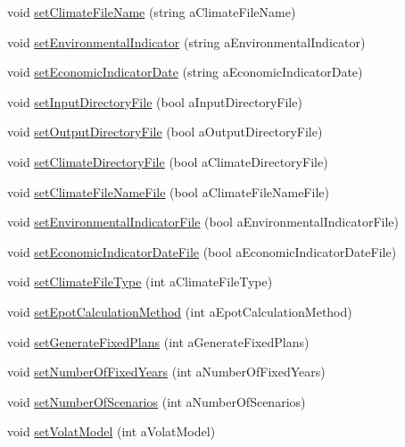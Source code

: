 \begin{DoxyCompactItemize}
\item 
void \hyperlink{classsystem_run_data_af47cd03f00b0ae29a8f5b83eee8ba440}{setClimateFileName} (string aClimateFileName)
\item 
void \hyperlink{classsystem_run_data_a3d9492ef34cf74ea73edf84ff810778e}{setEnvironmentalIndicator} (string aEnvironmentalIndicator)
\item 
void \hyperlink{classsystem_run_data_a6f7742228596337028e277054adf9c7b}{setEconomicIndicatorDate} (string aEconomicIndicatorDate)
\item 
void \hyperlink{classsystem_run_data_afce574d9174abd9e51f8c55011accd07}{setInputDirectoryFile} (bool aInputDirectoryFile)
\item 
void \hyperlink{classsystem_run_data_aa1e564e131ec1b124b81e107aba4e5d6}{setOutputDirectoryFile} (bool aOutputDirectoryFile)
\item 
void \hyperlink{classsystem_run_data_ae47063135ee24308da4bed987c61346b}{setClimateDirectoryFile} (bool aClimateDirectoryFile)
\item 
void \hyperlink{classsystem_run_data_a31fba0065583f2879c0821258e724546}{setClimateFileNameFile} (bool aClimateFileNameFile)
\item 
void \hyperlink{classsystem_run_data_abf669a871b0827b06932cb78fafcc8af}{setEnvironmentalIndicatorFile} (bool aEnvironmentalIndicatorFile)
\item 
void \hyperlink{classsystem_run_data_a7d39926c39f7f18df61263af1a25fb80}{setEconomicIndicatorDateFile} (bool aEconomicIndicatorDateFile)
\item 
void \hyperlink{classsystem_run_data_a31f6dae83f836b96ecf4dd6c92ef1880}{setClimateFileType} (int aClimateFileType)
\item 
void \hyperlink{classsystem_run_data_a994f764f2fd1ac3b25c5026b77126b0f}{setEpotCalculationMethod} (int aEpotCalculationMethod)
\item 
void \hyperlink{classsystem_run_data_a32e0a5750f39fa2fab1af0add1d5af0d}{setGenerateFixedPlans} (int aGenerateFixedPlans)
\item 
void \hyperlink{classsystem_run_data_a3c4165b768b3b87393cb3dfd032aedbc}{setNumberOfFixedYears} (int aNumberOfFixedYears)
\item 
void \hyperlink{classsystem_run_data_a915b959ef28738053a3f08d12e68cef8}{setNumberOfScenarios} (int aNumberOfScenarios)
\item 
void \hyperlink{classsystem_run_data_a785685ee46a6f4d0801fa42c0dbb591e}{setVolatModel} (int aVolatModel)
\item 

\end{DoxyCompactItemize}

